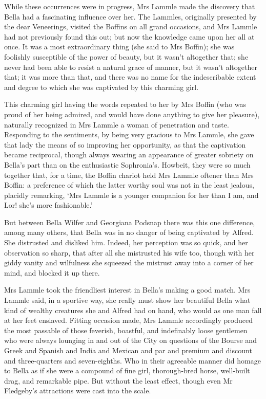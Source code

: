 While these occurrences were in progress, Mrs Lammle made the discovery
that Bella had a fascinating influence over her. The Lammles, originally
presented by the dear Veneerings, visited the Boffins on all grand
occasions, and Mrs Lammle had not previously found this out; but now the
knowledge came upon her all at once. It was a most extraordinary thing
(she said to Mrs Boffin); she was foolishly susceptible of the power of
beauty, but it wasn’t altogether that; she never had been able to resist
a natural grace of manner, but it wasn’t altogether that; it was more
than that, and there was no name for the indescribable extent and degree
to which she was captivated by this charming girl.

This charming girl having the words repeated to her by Mrs Boffin (who
was proud of her being admired, and would have done anything to give her
pleasure), naturally recognized in Mrs Lammle a woman of penetration
and taste. Responding to the sentiments, by being very gracious to Mrs
Lammle, she gave that lady the means of so improving her opportunity,
as that the captivation became reciprocal, though always wearing an
appearance of greater sobriety on Bella’s part than on the enthusiastic
Sophronia’s. Howbeit, they were so much together that, for a time, the
Boffin chariot held Mrs Lammle oftener than Mrs Boffin: a preference
of which the latter worthy soul was not in the least jealous, placidly
remarking, ‘Mrs Lammle is a younger companion for her than I am, and
Lor! she’s more fashionable.’

But between Bella Wilfer and Georgiana Podsnap there was this one
difference, among many others, that Bella was in no danger of being
captivated by Alfred. She distrusted and disliked him. Indeed, her
perception was so quick, and her observation so sharp, that after all
she mistrusted his wife too, though with her giddy vanity and wilfulness
she squeezed the mistrust away into a corner of her mind, and blocked it
up there.

Mrs Lammle took the friendliest interest in Bella’s making a good match.
Mrs Lammle said, in a sportive way, she really must show her beautiful
Bella what kind of wealthy creatures she and Alfred had on hand, who
would as one man fall at her feet enslaved. Fitting occasion made,
Mrs Lammle accordingly produced the most passable of those feverish,
boastful, and indefinably loose gentlemen who were always lounging in
and out of the City on questions of the Bourse and Greek and Spanish and
India and Mexican and par and premium and discount and three-quarters
and seven-eighths. Who in their agreeable manner did homage to Bella
as if she were a compound of fine girl, thorough-bred horse, well-built
drag, and remarkable pipe. But without the least effect, though even Mr
Fledgeby’s attractions were cast into the scale.

